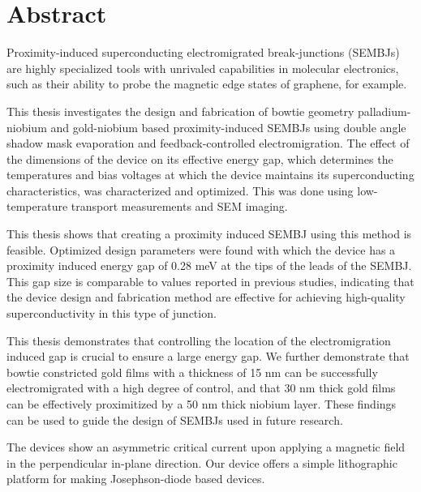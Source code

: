 \section*{Abstract}


Proximity-induced superconducting electromigrated break-junctions (SEMBJs) are highly specialized tools with unrivaled capabilities in molecular electronics, such as their ability to probe the magnetic edge states of graphene, for example.

This thesis investigates the design and fabrication of bowtie geometry palladium-niobium and gold-niobium based proximity-induced SEMBJs using double angle shadow mask evaporation and feedback-controlled electromigration. The effect of the dimensions of the device on its effective energy gap, which determines the temperatures and bias voltages at which the device maintains its superconducting characteristics, was characterized and optimized. This was done using low-temperature transport measurements and SEM imaging.

This thesis shows that creating a proximity induced SEMBJ using this method is feasible. Optimized design parameters were found with which the device has a proximity induced energy gap of 0.28 meV at the tips of the leads of the SEMBJ. This gap size is comparable to values reported in previous studies, indicating that the device design and fabrication method are effective for achieving high-quality superconductivity in this type of junction.

This thesis demonstrates that controlling the location of the electromigration induced gap is crucial to ensure a large energy gap. We further demonstrate that bowtie constricted gold films with a thickness of 15 nm can be successfully electromigrated with a high degree of control, and that 30 nm thick gold films can be effectively proximitized by a 50 nm thick niobium layer. These findings can be used to guide the design of SEMBJs used in future research. 

The devices show an asymmetric critical current upon applying a magnetic field in the perpendicular in-plane direction. Our device offers a simple lithographic platform for making Josephson-diode based devices.

















\newpage